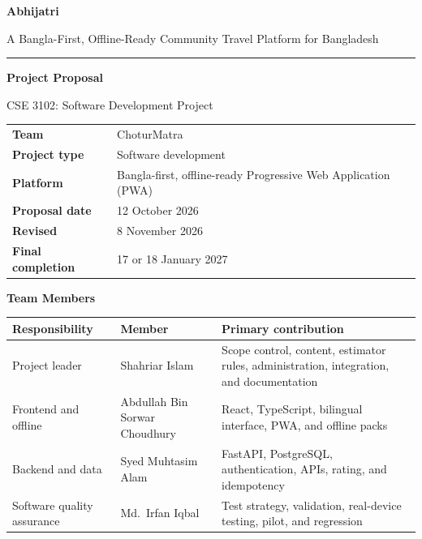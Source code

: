 \documentclass[11pt,a4paper]{article}
\newcommand{\hd}[1]{\textbf{#1}}
\begin{document}
\begin{titlepage}
  \centering
  \vspace*{20mm}
  {\fontsize{30}{36}\selectfont\bfseries Abhijatri\par}
  \vspace{4mm}
  {\Large A Bangla-First, Offline-Ready Community Travel Platform for Bangladesh\par}
  \vspace{10mm}
  \rule{0.55\textwidth}{0.4pt}\par
  \vspace{6mm}
  {\large\bfseries Project Proposal\par}
  \vspace{2mm}
  {\large CSE 3102: Software Development Project\par}
  \vspace{16mm}

  \begin{tabular}{L{40mm}L{95mm}}
    \toprule
    \hd{Team}             & ChoturMatra \\
    \hd{Project type}     & Software development \\
    \hd{Platform}         & Bangla-first, offline-ready Progressive Web Application (PWA) \\
    \hd{Proposal date}    & 12 October 2026 \\
    \hd{Revised}          & 8 November 2026 \\
    \hd{Final completion} & 17 or 18 January 2027 \\
    \bottomrule
  \end{tabular}

  \vfill
  {\large\bfseries Team Members\par}
  \vspace{4mm}
  \begin{tabularx}{\textwidth}{L{36mm}L{48mm}Y}
    \toprule
    \hd{Responsibility} & \hd{Member} & \hd{Primary contribution} \\
    \midrule
    Project leader              & Shahriar Islam                & Scope control, content, estimator rules, administration, integration, and documentation \\
    Frontend and offline        & Abdullah Bin Sorwar Choudhury & React, TypeScript, bilingual interface, PWA, and offline packs \\
    Backend and data            & Syed Muhtasim Alam            & FastAPI, PostgreSQL, authentication, APIs, rating, and idempotency \\
    Software quality assurance  & Md.\ Irfan Iqbal              & Test strategy, validation, real-device testing, pilot, and regression \\
    \bottomrule
  \end{tabularx}
  \vspace{6mm}
\end{titlepage}
\end{document}
